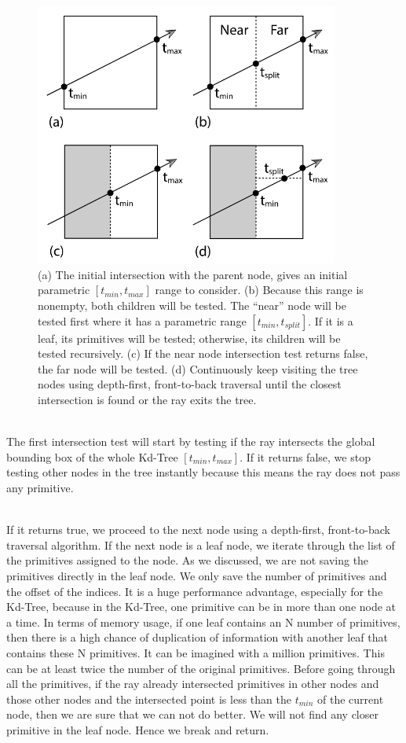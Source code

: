 \documentclass[11pt,a4paper]{article}
\begin{document}
\begin{figure}[H]	
     \centering
     \captionsetup{justification=centering,margin=2cm}
     \includegraphics[width=10cm]{images/kdtree/traversal.png}
     \caption{(a) The initial intersection with the parent node, gives an initial parametric $[t_{min}, t_{max}]$ range to consider. (b) Because this range is nonempty, both children will be tested. The “near” node will be tested first where it has a parametric range $[t_{min}, t_{split}]$. If it is a leaf, its primitives will be tested; otherwise, its children will be tested recursively. (c) If the near node intersection test returns false, the far node will be tested. (d) Continuously keep visiting the tree nodes using depth-first, front-to-back traversal until the closest intersection is found or the ray exits the tree.  \protect\cite{Pharr2016}}
        \label{fig:dice}
\end{figure}

\noindent
\\
The first intersection test will start by testing if the ray intersects the global bounding box of the whole Kd-Tree $[t_{min}, t_{max}]$. If it returns false, we stop testing other nodes in the tree instantly because this means the ray does not pass any primitive.

\noindent
\\
If it returns true, we proceed to the next node using a depth-first, front-to-back traversal algorithm. If the next node is a leaf node, we iterate through the list of the primitives assigned to the node. As we discussed, we are not saving the primitives directly in the leaf node. We only save the number of primitives and the offset of the indices. It is a huge performance advantage, especially for the Kd-Tree, because in the Kd-Tree, one primitive can be in more than one node at a time. In terms of memory usage, if one leaf contains an N number of primitives, then there is a high chance of duplication of information with another leaf that contains these N primitives. It can be imagined with a million primitives. This can be at least twice the number of the original primitives. Before going through all the primitives, if the ray already intersected primitives in other nodes and those other nodes and the intersected point is less than the $t_{min}$ of the current node, then we are sure that we can not do better. We will not find any closer primitive in the leaf node. Hence we break and return. 
 
\end{document}
